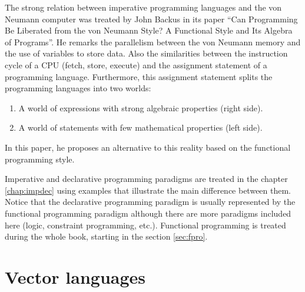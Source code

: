 The strong relation between imperative programming languages and the von Neumann computer was treated by John Backus in its paper ``Can 
Programming Be Liberated from the von Neumann Style? A Functional Style and Its Algebra of Programs''. 
He remarks the parallelism between the von Neumann memory and the use of variables to store data.
Also the similarities between the instruction cycle of a CPU (fetch, store, execute) and the assignment statement of a programming language. 
Furthermore, this assignment statement splits the programming languages into two worlds: 
\begin{enumerate}
    \item A world of expressions with strong algebraic properties (right side).
    \item A world of statements with few mathematical properties (left side).
\end{enumerate} 
In this paper, he proposes an alternative to this reality based on the functional programming style. 

Imperative and declarative programming paradigms are treated in the chapter \ref{chap:impdec} using examples that illustrate the main difference between them. 
Notice that the declarative programming paradigm is usually represented by the functional programming paradigm although there are more paradigms included here (logic, constraint programming, etc.).
Functional programming is treated during the whole book, starting in the section \ref{sec:fpro}.

 

 
 
 
 
 
 
    \section{Vector languages}
 
